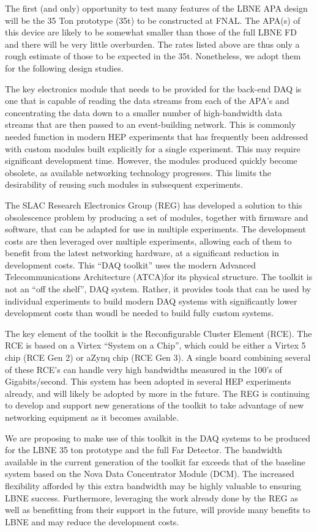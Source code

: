 The first (and only) opportunity to test many features of the LBNE APA 
design will be the 35 Ton prototype (35t) to be constructed at FNAL.
The APA(s) of this device are likely to be somewhat smaller than 
those of the full LBNE FD and there will be very little overburden.
The rates listed above are thus only a rough estimate of those to be
expected in the 35t.
Nonetheless, we adopt them for the following design studies.

The key electronics module that needs to be provided for the back-end DAQ is 
one that is capable of reading the data streams from each of the
APA's and concentrating the data down to a smaller number of high-bandwidth 
data streams that are then passed to an event-building network.
This is commonly needed function in modern HEP experiments that has frequently 
been addressed with custom modules built explicitly for a single experiment.
This may require significant development time.
However, the modules produced quickly
become obsolete, as available networking technology progresses.
This limits the desirability of reusing such modules in subsequent experiments.

The SLAC Research Electronics Group (REG) has developed a solution to this 
obsolescence problem 
by producing a set of modules, together with firmware and software, that can
be adapted for use in multiple experiments.
The development costs are then leveraged over multiple experiments, allowing 
each of them to benefit from the latest networking hardware, at a significant 
reduction in development costs. 
This ``DAQ toolkit'' uses the modern Advanced Telecommunications Architecture 
(ATCA)for its physical structure.
The toolkit is not an ``off the shelf'', DAQ system.
Rather, it provides tools that can be used by individual experiments to 
build modern DAQ systems with significantly lower development costs than
woudl be needed to build fully custom systems.

The key element of the toolkit is the Reconfigurable Cluster Element (RCE).
The RCE is based on a Virtex  ``System on a Chip'', which could be 
either a Virtex 5 chip (RCE Gen 2) or aZynq chip (RCE Gen 3).
A single board combining several of these RCE's can handle very high bandwidths measured
in the 100's of Gigabits/second. 
This system has been adopted in several HEP experiments already, and will likely 
be adopted by more in the future. 
The REG is continuing to develop and support new generations 
of the toolkit to take advantage of new networking equipment as it becomes available.

We are proposing to make use of this toolkit in the DAQ systems to be produced
for the LBNE 35 ton prototype and the full Far Detector.
The bandwidth available in the current generation of the toolkit far
exceeds that of the baseline system based on the Nova Data Concentrator 
Module (DCM).
The increased flexibility afforded by this extra bandwidth may be highly valuable to 
ensuring LBNE success.
Furthermore, leveraging the work already done by the REG as well as benefitting from
their support in the future, will provide many benefits to LBNE and may reduce
the development costs.